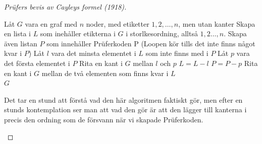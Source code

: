 \documentclass[nobib]{tufte-handout}
\begin{document}
\begin{proof}[Prüfers bevis av Cayleys formel (1918)]
    \begin{algorithm}
        \caption{Konstruktion av träd från Prüferkoder}\label{alg:constr_tree_from_prufer_code}
        \begin{algorithmic}
            \State Låt $G$ vara en graf med $n$ noder, med etiketter $1, 2, \ldots, n$, men utan kanter
            \State Skapa en lista i $L$ som inehåller etikterna i $G$ i storlkesordning, alltså $1, 2 \ldots, n$.
            \State Skapa även listan $P$ som innehåller Prüferkoden
            \While P (Loopen kör tills det inte finns något kvar i $P$)
            \State Låt $l$ vara det minsta elementet i $L$ som inte finns med i $P$
            \State Låt $p$ vara det första elementet i $P$
            \State Rita en kant i $G$ mellan $l$ och $p$ 
            \State $L = L - l$
            \State $P = P - p$
            \EndWhile
            \State Rita en kant i $G$ mellan de två elementen som finns kvar i $L$\\
            \Return $G$
        \end{algorithmic}
    \end{algorithm}


    Det tar en stund att förstå vad den här algoritmen faktiskt gör, men efter en stunds kontemplation ser man att vad den gör är att den lägger till kanterna i precis den ordning som de försvann när vi skapade Prüferkoden.

   

    \begin{figure}
        \centering
\end{figure}
\end{proof}
\end{document}
